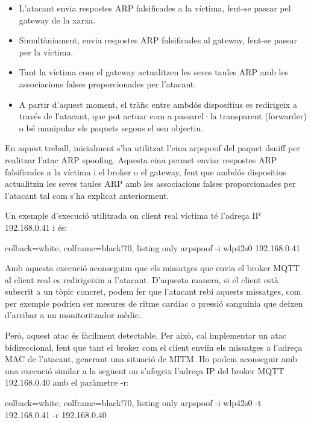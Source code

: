 \begin{itemize}
    \item L’atacant envia respostes ARP falsificades a la víctima, fent-se passar pel gateway de la xarxa.
    \item Simultàniament, envia respostes ARP falsificades al gateway, fent-se passar per la víctima.
    \item Tant la víctima com el gateway actualitzen les seves taules ARP amb les associacions falses proporcionades per l’atacant.
    \item A partir d’aquest moment, el tràfic entre ambdós dispositius es redirigeix a través de l’atacant, que pot actuar com a passarel·la transparent (forwarder) o bé manipular els paquets segons el seu objectiu.
\end{itemize}

En aquest treball, inicialment s'ha utilitzat l'eina arpspoof del paquet dsniff per realitzar l'atac ARP spoofing. Aquesta eina permet enviar respostes ARP falsificades a la víctima i el broker o el gateway, fent que ambdós dispositius actualitzin les seves taules ARP amb les associacions falses proporcionades per l'atacant tal com s'ha explicat anteriorment.

Un exemple d'execució utilitzada on client real víctima té l'adreça IP 192.168.0.41 i és:

\begin{tcblisting}{colback=white, colframe=black!70, listing only}
    arpspoof -i wlp42s0 192.168.0.41
\end{tcblisting}

Amb aquesta execució aconseguim que els missatges que envia el broker MQTT al client real es redirigeixin a l'atacant. D'aquesta manera, si el client està subscrit a un tòpic concret, podem fer que l'atacant rebi aquests missatges, com per exemple podrien ser mesures de ritme cardíac o pressió sanguínia que deixen d'arribar a un monitoritzador mèdic. 

Però, aquest atac és fàcilment detectable. Per això, cal implementar un atac bidireccional, fent que tant el broker com el client enviïn els missatges a l'adreça MAC de l'atacant, generant una situació de MITM. Ho podem aconseguir amb una execució similar a la següent on s'afegeix l'adreça IP del broker MQTT 192.168.0.40 amb el paràmetre -r:

\begin{tcblisting}{colback=white, colframe=black!70, listing only}
    arpspoof -i wlp42s0 -t 192.168.0.41 -r 192.168.0.40
\end{tcblisting}

